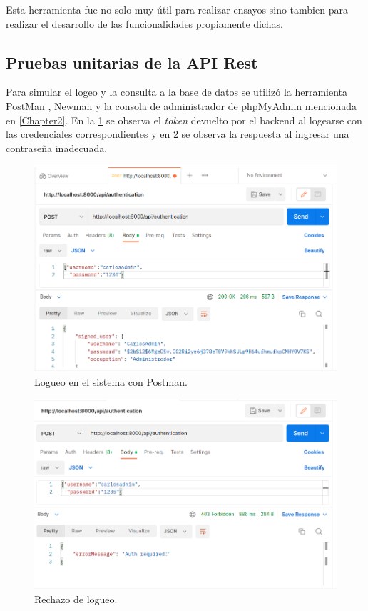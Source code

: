 Esta herramienta fue no solo muy útil para realizar ensayos sino tambien para realizar el desarrollo de las funcionalidades propiamente dichas.

\pagebreak

\subsection{Pruebas unitarias de la API Rest}

Para simular el logeo y la consulta a la base de datos se utilizó la herramienta PostMan \citep{WEBSITE:30}, Newman \citep{WEBSITE:35} y la consola de administrador de phpMyAdmin mencionada en \ref{Chapter2}. En la \ref{fig:Logueo en el sistema con Postman} se observa el \textit{token} devuelto por el backend al logearse con las credenciales correspondientes y en \ref{fig:Rechazo Logueo en el sistema con Postman} se observa la respuesta al ingresar una contraseña inadecuada.

\begin{figure}[ht]
	\centering
	\includegraphics[scale=.35]{./Figures/auth.png}
	\caption{Logueo en el sistema con Postman.}
	\label{fig:Logueo en el sistema con Postman}
\end{figure}

\begin{figure}[ht]
	\centering
	\includegraphics[scale=.35]{./Figures/no-auth.png}
	\caption{Rechazo de logueo.}
	\label{fig:Rechazo Logueo en el sistema con Postman}
\end{figure}

